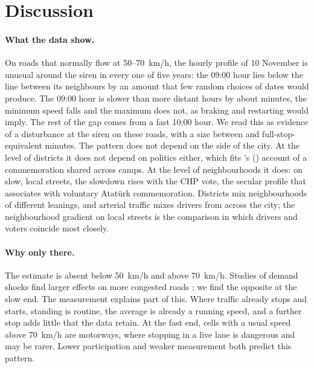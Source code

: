 \documentclass[11pt,a4paper]{article}
\begin{document}
\section{Discussion}

\paragraph{What the data show.} On roads that normally flow at 50--70~km/h, the hourly profile of
10 November is unusual around the siren in every one of five years: the 09:00 hour lies below the
line between its neighbours by an amount that few random choices of dates would produce. The 09:00
hour is slower than more distant hours by about \minRobFar{} minutes, the minimum speed falls and
the maximum does not, as braking and restarting would imply. The rest of the gap comes from a fast
10:00 hour. We read this as evidence of a disturbance at the siren on these roads, with a size
between \minRobFar{} and \minFast{} full-stop-equivalent minutes.
The pattern does not depend on the side of the city. At the level of districts it does not depend
on politics either, which fits \citeauthor{goldman2018}'s (\citeyear{goldman2018}) account of a
commemoration shared across camps. At the level of neighbourhoods it does: on slow, local streets,
the slowdown rises with the CHP vote, the secular profile that \citet{ozyurek2004} associates with
voluntary Atatürk commemoration. Districts mix neighbourhoods of different leanings, and arterial
traffic mixes drivers from across the city; the neighbourhood gradient on local streets is the
comparison in which drivers and voters coincide most closely.

\paragraph{Why only there.} The estimate is absent below 50~km/h and above 70~km/h. Studies of
demand shocks find larger effects on more congested roads \citep{adler2021,hanna2017}; we find the
opposite at the slow end. The measurement explains part of this. Where traffic already stops and
starts, standing is routine, the average is already a running speed, and a further stop adds little
that the data retain. At the fast end, cells with a usual speed above 70~km/h are motorways, where
stopping in a live lane is dangerous and may be rarer. Lower participation and weaker measurement
both predict this pattern.
\end{document}
